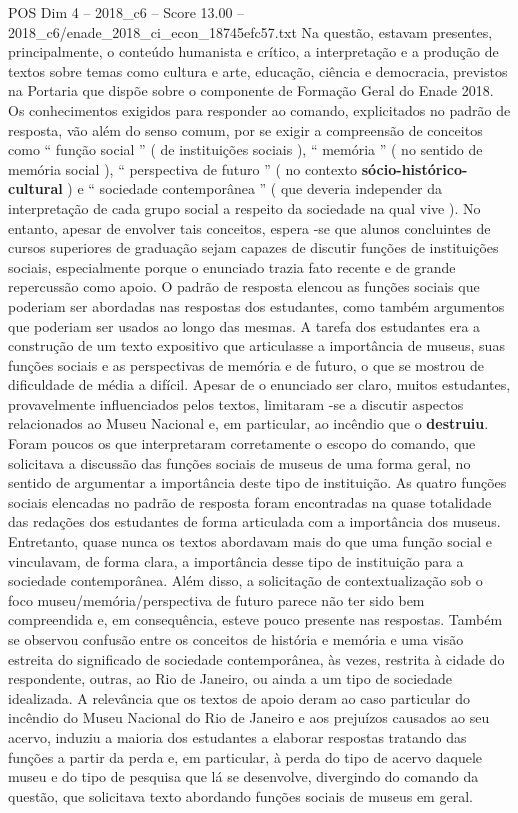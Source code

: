 \begin{textsample}{POS Dim 4 – 2018\_c6 – Score 13.00 – 2018\_c6/enade\_2018\_ci\_econ\_18745efc57.txt}
Na questão, estavam presentes, principalmente, o conteúdo humanista e crítico, a interpretação e a produção de textos sobre temas como cultura e arte, educação, ciência e democracia, previstos na Portaria que dispõe sobre o componente de Formação Geral do Enade 2018.
Os conhecimentos exigidos para responder ao comando, explicitados no padrão de resposta, vão além do senso comum, por se exigir a compreensão de conceitos como “ função social ” ( de instituições sociais ), “ memória ” ( no sentido de memória social ), “ perspectiva de futuro ” ( no contexto \textbf{sócio-histórico-cultural} ) e “ sociedade contemporânea ” ( que deveria independer da interpretação de cada grupo social a respeito da sociedade na qual vive ).
No entanto, apesar de envolver tais conceitos, espera -se que alunos concluintes de cursos superiores de graduação sejam capazes de discutir funções de instituições sociais, especialmente porque o enunciado trazia fato recente e de grande repercussão como apoio.
O padrão de resposta elencou as funções sociais que poderiam ser abordadas nas respostas dos estudantes, como também argumentos que poderiam ser usados ao longo das mesmas.
A tarefa dos estudantes era a construção de um texto expositivo que articulasse a importância de museus, suas funções sociais e as perspectivas de memória e de futuro, o que se mostrou de dificuldade de média a difícil.
Apesar de o enunciado ser claro, muitos estudantes, provavelmente influenciados pelos textos, limitaram -se a discutir aspectos relacionados ao Museu Nacional e, em particular, ao incêndio que o \textbf{destruiu}.
Foram poucos os que interpretaram corretamente o escopo do comando, que solicitava a discussão das funções sociais de museus de uma forma geral, no sentido de argumentar a importância deste tipo de instituição.
As quatro funções sociais elencadas no padrão de resposta foram encontradas na quase totalidade das redações dos estudantes de forma articulada com a importância dos museus.
Entretanto, quase nunca os textos abordavam mais do que uma função social e vinculavam, de forma clara, a importância desse tipo de instituição para a sociedade contemporânea.
Além disso, a solicitação de contextualização sob o foco museu/memória/perspectiva de futuro parece não ter sido bem compreendida e, em consequência, esteve pouco presente nas respostas.
Também se observou confusão entre os conceitos de história e memória e uma visão estreita do significado de sociedade contemporânea, às vezes, restrita à cidade do respondente, outras, ao Rio de Janeiro, ou ainda a um tipo de sociedade idealizada.
A relevância que os textos de apoio deram ao caso particular do incêndio do Museu Nacional do Rio de Janeiro e aos prejuízos causados ao seu acervo, induziu a maioria dos estudantes a elaborar respostas tratando das funções a partir da perda e, em particular, à perda do tipo de acervo daquele museu e do tipo de pesquisa que lá se desenvolve, divergindo do comando da questão, que solicitava texto abordando funções sociais de museus em geral.

\end{textsample}

